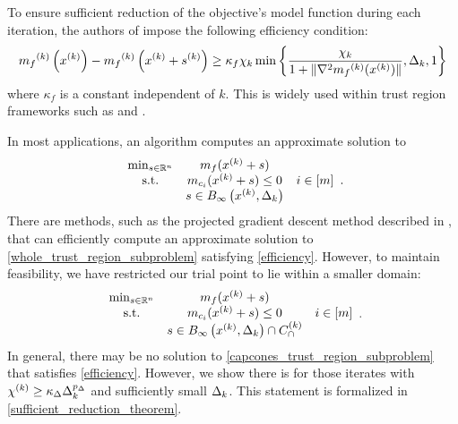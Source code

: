 To ensure sufficient reduction of the objective's model function during each iteration, the authors of \cite{Conejo:2013:GCT:2620806.2621814} impose the following efficiency condition:
\begin{align}
\label{efficiency}
{{m}_f}^{(k)}\left(x^{(k)}\right) - {{m}_f}^{(k)}\left(x^{(k)} + {{s}^{(k)}}\right) \ge \kappa_f \chi_k \min\left\{ \frac{\chi_k}{1+\|\nabla^2 {{m}_f}^{(k)}(x^{(k)})\|}, \Delta_k, 1 \right\}
\end{align}
where $\kappa_f$ is a constant independent of $k$.
This is widely used within trust region frameworks such as \cite{Conejo:2013:GCT:2620806.2621814} and \cite{Conn:2000:TM:357813}.

In most applications, an algorithm computes an approximate solution to
\begin{align}
\label{whole_trust_region_subproblem}
\begin{array}{ccc}
\min_{s \in \mathbb R^n} & m_{f}(x^{(k)} + s) & \\
\textrm{s.t.} & m_{c_i}(x^{(k)} + s) \le 0 & i \in [m]\\
& s \in { B_{\infty}\left(x^{(k)}, \Delta_k\right) } & \\
\end{array}.
\end{align}
There are methods, such as the projected gradient descent method described in \cite{Conn:2000:TM:357813},
that can efficiently compute an approximate solution to \cref{whole_trust_region_subproblem} satisfying \cref{efficiency}.
However, to maintain feasibility, we have restricted our trial point to lie within a smaller domain:
\begin{align}
\label{capcones_trust_region_subproblem}
\begin{array}{ccc}
\min_{s \in \mathbb R^n} & m_{f}(x^{(k)} + s) & \\
\textrm{s.t.} & m_{c_i}(x^{(k)} + s) \le 0 & i \in [m]\\
& s \in { B_{\infty}\left(x^{(k)}, \Delta_k\right) } \cap {C^{(k)}_{\cap}} &
\end{array}.
\end{align}
In general, there may be no solution to \cref{capcones_trust_region_subproblem} that satisfies \cref{efficiency}.
However, we show there is for those iterates with ${\chi^{(k)}} \ge \kappa_{\Delta}\Delta_k^{p_{\Delta}}$ and sufficiently small $\Delta_k$.
This statement is formalized in \cref{sufficient_reduction_theorem}.



